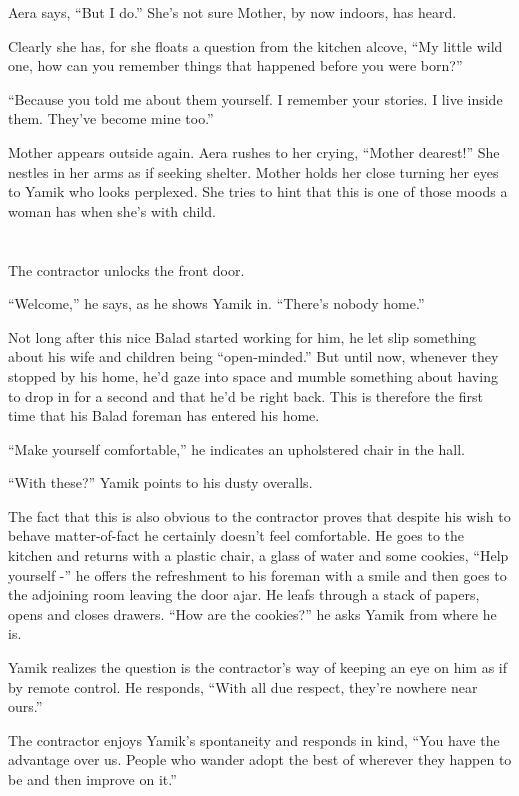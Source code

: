 \documentclass[twoside,11pt]{book}
\begin{document}
Aera says, ``But I do.'' She's not sure Mother, by now indoors, has heard.

Clearly she has, for she floats a question from the kitchen alcove, ``My little wild one, how can you
remember things that happened before you were born?''

``Because you told me about them yourself. I remember your stories. I live inside them. They've become mine
too.''

Mother appears outside again.  Aera rushes to her crying, ``Mother dearest!'' She nestles in
her arms as if seeking shelter. Mother holds her close turning her eyes to Yamik who looks perplexed. She tries to hint
that this is one of those moods a woman has when she's with child.



\chapter{}

The contractor unlocks the front door.

``Welcome,'' he says, as he shows Yamik in. ``There's nobody home.''


Not long after this nice Balad started working for him, he let slip something about his wife and children being
``open-minded.'' But until now, whenever they stopped by his home, he'd gaze into space and mumble something about
having to drop in for a second and that he'd be right back.  This is therefore the first time that his Balad foreman
has entered his home.

``Make yourself comfortable,'' he indicates an upholstered chair in the hall.

``With these?'' Yamik points to his dusty overalls.

The fact that this is also obvious to the contractor proves that despite his wish to behave matter-of-fact he certainly
doesn't feel comfortable. He goes to the kitchen and returns with a plastic chair, a glass of water and some cookies,
``Help yourself -'' he offers the refreshment to his foreman with a smile and then goes to
the adjoining room leaving the door ajar. He leafs through a stack of papers, opens and closes drawers.
``How are the cookies?'' he asks Yamik from where he is.

Yamik realizes the question is the contractor's way of keeping an eye on him as if by remote control. He responds,
``With all due respect, they're nowhere near ours.''

The contractor enjoys Yamik's spontaneity and responds in kind, ``You have the advantage over us. People
who wander adopt the best of wherever they happen to be and then improve on it.''
\end{document}
